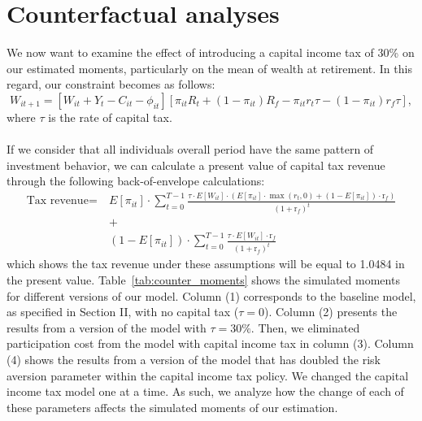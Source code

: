 \documentclass[13pt]{article}
\begin{document}
\section{Counterfactual analyses}
We now want to examine the effect of introducing a capital income tax of 30\% on our estimated moments, particularly on the mean of wealth at retirement. In this regard, our constraint becomes as follows:
\begin{equation*}
W_{it+1} = \left[ W_{it} + Y_t - C_{it} - \phi_{it} \right] \left[ \pi_{it}R_t + (1 - \pi_{it})R_f - \pi_{it}r_t\tau - (1 - \pi_{it})r_f\tau \right],
\end{equation*}
where \(\tau\) is the rate of capital tax.
\\\\
If we consider that all individuals overall period have the same pattern of investment behavior, we can calculate a present value of capital tax revenue through the following back-of-envelope calculations:
\begin{equation*}
\begin{aligned}
\text{Tax revenue} =\ & E[\pi_{it}] \cdot \sum_{t=0}^{T-1} \frac{\tau \cdot E[W_{it}] \cdot \left(E[\pi_{it}] \cdot \max(r_t, 0) + (1 - E[\pi_{it}]) \cdot \text{r}_{f}\right)}{(1 + \text{r}_{f})^t} \\
&+ \\
&\left(1 - E[\pi_{it}]\right) \cdot \sum_{t=0}^{T-1} \frac{\tau \cdot E[W_{it}] \cdot \text{r}_{f}}{(1 + \text{r}_{f})^t}
\end{aligned}
\end{equation*}
which shows the tax revenue under these assumptions will be equal to 1.0484 in the present value. 
Table~\ref{tab:counter_moments} shows the simulated moments for different versions of our model. Column (1) corresponds to the baseline model, as specified in Section II, with no capital tax (\(\tau=0\)). Column (2) presents the results from a version of the model with \(\tau=30\%\). Then, we eliminated participation cost from the model with capital income tax in column (3). Column (4) shows the results from a version of the model that has doubled the risk aversion parameter within the capital income tax policy. We changed the capital income tax model one at a time. As such, we analyze how the change of each of these parameters affects the simulated moments of our estimation.
\end{document}

